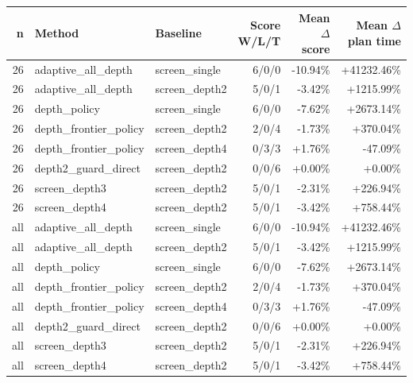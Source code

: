 \begin{tabular}{rllrrr}
\toprule
n & Method & Baseline & Score W/L/T & Mean $\Delta$ score & Mean $\Delta$ plan time \\
\midrule
26 & adaptive\_all\_depth & screen\_single & 6/0/0 & -10.94\% & +41232.46\% \\
26 & adaptive\_all\_depth & screen\_depth2 & 5/0/1 & -3.42\% & +1215.99\% \\
26 & depth\_policy & screen\_single & 6/0/0 & -7.62\% & +2673.14\% \\
26 & depth\_frontier\_policy & screen\_depth2 & 2/0/4 & -1.73\% & +370.04\% \\
26 & depth\_frontier\_policy & screen\_depth4 & 0/3/3 & +1.76\% & -47.09\% \\
26 & depth2\_guard\_direct & screen\_depth2 & 0/0/6 & +0.00\% & +0.00\% \\
26 & screen\_depth3 & screen\_depth2 & 5/0/1 & -2.31\% & +226.94\% \\
26 & screen\_depth4 & screen\_depth2 & 5/0/1 & -3.42\% & +758.44\% \\
all & adaptive\_all\_depth & screen\_single & 6/0/0 & -10.94\% & +41232.46\% \\
all & adaptive\_all\_depth & screen\_depth2 & 5/0/1 & -3.42\% & +1215.99\% \\
all & depth\_policy & screen\_single & 6/0/0 & -7.62\% & +2673.14\% \\
all & depth\_frontier\_policy & screen\_depth2 & 2/0/4 & -1.73\% & +370.04\% \\
all & depth\_frontier\_policy & screen\_depth4 & 0/3/3 & +1.76\% & -47.09\% \\
all & depth2\_guard\_direct & screen\_depth2 & 0/0/6 & +0.00\% & +0.00\% \\
all & screen\_depth3 & screen\_depth2 & 5/0/1 & -2.31\% & +226.94\% \\
all & screen\_depth4 & screen\_depth2 & 5/0/1 & -3.42\% & +758.44\% \\
\bottomrule
\end{tabular}
